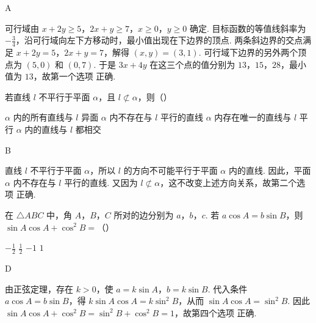 \begin{answer}
A
\end{answer}

\begin{solution}
可行域由 \(x+2y\geqslant 5\)，\(2x+y\geqslant 7\)，\(x\geqslant 0\)，\(y\geqslant 0\) 确定. 目标函数的等值线斜率为 \(-\frac34\)，沿可行域向左下方移动时，最小值出现在下边界的顶点. 两条斜边界的交点满足 \(x+2y=5\)，\(2x+y=7\)，解得 \((x,y)=(3,1)\). 可行域下边界的另外两个顶点为 \((5,0)\) 和 \((0,7)\). 于是 \(3x+4y\) 在这三个点的值分别为 \(13\)，\(15\)，\(28\)，最小值为 \(13\)，故第一个选项 正确.
\end{solution}

\begin{problem}
若直线 \(l\) 不平行于平面 \(\alpha\)，且 \(l \not\subset \alpha\)，则（\quad）

\choices
    {\(\alpha\) 内的所有直线与 \(l\) 异面}
    {\(\alpha\) 内不存在与 \(l\) 平行的直线}
    {\(\alpha\) 内存在唯一的直线与 \(l\) 平行}
    {\(\alpha\) 内的直线与 \(l\) 都相交}
\end{problem}

\begin{answer}
B
\end{answer}

\begin{solution}
直线 \(l\) 不平行于平面 \(\alpha\)，所以 \(l\) 的方向不可能平行于平面 \(\alpha\) 内的直线. 因此，平面 \(\alpha\) 内不存在与 \(l\) 平行的直线. 又因为 \(l\not\subset\alpha\)，这不改变上述方向关系，故第二个选项 正确.
\end{solution}

\begin{problem}
在 \(\triangle ABC\) 中，角 \(A\)，\(B\)，\(C\) 所对的边分别为 \(a\)，\(b\)，\(c\). 若 \(a \cos A = b \sin B\)，则 \(\sin A \cos A + \cos^2 B =\)（\quad）

\choices
    {\(-\frac{1}{2}\)}
    {\(\frac{1}{2}\)}
    {\(-1\)}
    {\(1\)}
\end{problem}

\begin{answer}
D
\end{answer}

\begin{solution}
由正弦定理，存在 \(k>0\)，使 \(a=k\sin A\)，\(b=k\sin B\). 代入条件 \(a\cos A=b\sin B\)，得 \(k\sin A\cos A=k\sin^2B\)，从而 \(\sin A\cos A=\sin^2B\). 因此 \(\sin A\cos A+\cos^2B=\sin^2B+\cos^2B=1\)，故第四个选项 正确.
\end{solution}

